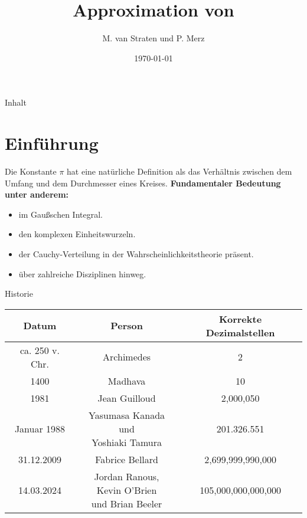 \documentclass[9pt, t]{beamer}
\title{Approximation von \textpi}
\author{M. van Straten und P. Merz}
\institute{Humboldt-Universität zu Berlin \\
           Sommersemester 2024}
\date{\today}
\begin{document}
\maketitle

\begin{frame}{Inhalt}
    \tableofcontents[pausesections]
\end{frame}

\section{Einführung}

\begin{frame}
    Die Konstante \(\pi\) hat eine natürliche Definition als das Verhältnis
    zwischen dem Umfang und dem Durchmesser eines Kreises.
    \newline\newline
    \textbf{Fundamentaler Bedeutung unter anderem:}
    \begin{itemize}[<+(1)->]
        \item im Gaußschen Integral.
        \item den komplexen Einheitswurzeln.
        \item der Cauchy-Verteilung in der Wahrscheinlichkeitstheorie präsent.
        \item über zahlreiche Disziplinen hinweg.
    \end{itemize}
\end{frame}

\begin{frame}{Historie}
    \begin{tabular}{|c||c||c|}
        \hline
        Datum       & Person                          & Korrekte Dezimalstellen \\
        \hline
        ca. 250 v.
        Chr.
                    & Archimedes                      & 2                       \\
        \hline
        1400        & Madhava                         & 10                      \\
        \hline
        1981        & Jean Guilloud                   & 2,000,050               \\
        \hline
        Januar 1988 & \shortstack{Yasumasa Kanada und                           \\ Yoshiaki Tamura} & 201.326.551\\
        \hline
        31.12.2009  & Fabrice Bellard                 & 2,699,999,990,000       \\
        \hline
        14.03.2024  & \shortstack{Jordan Ranous,                                \\
        Kevin O’Brien                                                           \\ und Brian Beeler} & 105,000,000,000,000\\
        \hline
    \end{tabular}
    \cite{Chronology}
\end{frame}
\end{document}
